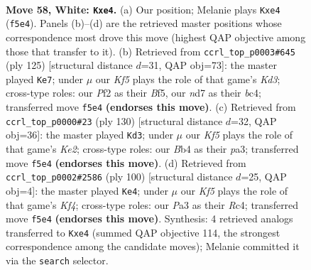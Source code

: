 \documentclass[11pt]{article}
\begin{document}
\clearpage

\begin{figure}[p]\centering
\begin{subfigure}{0.46\textwidth}\centering
\resizebox{\linewidth}{!}{%
\newchessgame
\chessboard[
  setfen={7k/3n1p2/8/3r1K2/pB2p2p/P6P/5P1R/8 w - - 16 58},
  showmover=false,
  pgfstyle=straightmove, color=movearrow, markmove={f5-e4}
]}
\caption{}
\end{subfigure}\hfill
\begin{subfigure}{0.46\textwidth}\centering
\resizebox{\linewidth}{!}{%
\newchessgame
\chessboard[
  setfen={3R4/8/3k4/3Ppbp1/1KB4p/5P1P/6r1/8 b - - 3 63},
  showmover=false,
  pgfstyle=straightmove, color=movearrow, markmove={d6-e7}
]}
\caption{}
\end{subfigure}
\\[4pt]
\begin{subfigure}{0.46\textwidth}\centering
\resizebox{\linewidth}{!}{%
\newchessgame
\chessboard[
  setfen={8/6k1/2p5/2R5/2PpP3/pP6/r3KP2/8 w - - 0 66},
  showmover=false,
  pgfstyle=straightmove, color=movearrow, markmove={e2-d3}
]}
\caption{}
\end{subfigure}\hfill
\begin{subfigure}{0.46\textwidth}\centering
\resizebox{\linewidth}{!}{%
\newchessgame
\chessboard[
  setfen={7k/5p2/4p2p/4P2P/n1RB1K2/8/r7/8 w - - 7 51},
  showmover=false,
  pgfstyle=straightmove, color=movearrow, markmove={f4-e4}
]}
\caption{}
\end{subfigure}
\caption{\textbf{Move 58, White: \texttt{Kxe4}.} (a) Our position; Melanie plays \texttt{Kxe4} (\texttt{f5e4}). Panels (b)--(d) are the retrieved master positions whose correspondence most drove this move (highest QAP objective among those that transfer to it). (b) Retrieved from \texttt{ccrl\_top\_p0003\#645} (ply 125) [structural distance $d$=31, QAP obj=73]: the master played \texttt{Ke7}; under $\mu$ our \emph{Kf5} plays the role of that game's \emph{Kd3}; cross-type roles: our \emph{P}f2 as their \emph{B}f5, our \emph{n}d7 as their \emph{b}c4; transferred move \texttt{f5e4} \textbf{(endorses this move)}. (c) Retrieved from \texttt{ccrl\_top\_p0000\#23} (ply 130) [structural distance $d$=32, QAP obj=36]: the master played \texttt{Kd3}; under $\mu$ our \emph{Kf5} plays the role of that game's \emph{Ke2}; cross-type roles: our \emph{B}b4 as their \emph{p}a3; transferred move \texttt{f5e4} \textbf{(endorses this move)}. (d) Retrieved from \texttt{ccrl\_top\_p0002\#2586} (ply 100) [structural distance $d$=25, QAP obj=4]: the master played \texttt{Ke4}; under $\mu$ our \emph{Kf5} plays the role of that game's \emph{Kf4}; cross-type roles: our \emph{P}a3 as their \emph{R}c4; transferred move \texttt{f5e4} \textbf{(endorses this move)}. Synthesis: 4 retrieved analogs transferred to \texttt{Kxe4} (summed QAP objective 114, the strongest correspondence among the candidate moves); Melanie committed it via the \texttt{search} selector.}
\label{fig:thought-m114}
\end{figure}
\end{document}
